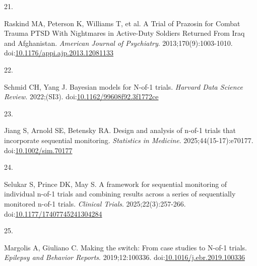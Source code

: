 \documentclass[
  11pt,
]{article}
\newlength{\cslhangindent}
\newlength{\csllabelwidth}
\newenvironment{CSLReferences}[2] %
 {\begin{list}{}{%
  \setlength{\itemindent}{0pt}
  \setlength{\leftmargin}{0pt}
  \setlength{\parsep}{0pt}
  \ifodd #1
   \setlength{\leftmargin}{\cslhangindent}
   \setlength{\itemindent}{-1\cslhangindent}
  \fi
  \setlength{\itemsep}{#2\baselineskip}}}
 {\end{list}}
\newcommand{\CSLLeftMargin}[1]{\parbox[t]{\csllabelwidth}{\strut#1\strut}}
\newcommand{\CSLRightInline}[1]{\parbox[t]{\linewidth - \csllabelwidth}{\strut#1\strut}}
\begin{document}
\begin{CSLReferences}{0}{1}
\CSLLeftMargin{21. }%
\CSLRightInline{Raskind MA, Peterson K, Williams T, et al. A {Trial} of {Prazosin} for {Combat Trauma PTSD With Nightmares} in {Active-Duty Soldiers Returned From Iraq} and {Afghanistan}. \emph{American Journal of Psychiatry}. 2013;170(9):1003-1010. doi:\href{https://doi.org/10.1176/appi.ajp.2013.12081133}{10.1176/appi.ajp.2013.12081133}}

\CSLLeftMargin{22. }%
\CSLRightInline{Schmid CH, Yang J. Bayesian models for {N}-of-1 trials. \emph{Harvard Data Science Review}. 2022;(SI3). doi:\href{https://doi.org/10.1162/99608f92.3f1772ce}{10.1162/99608f92.3f1772ce}}

\CSLLeftMargin{23. }%
\CSLRightInline{Jiang S, Arnold SE, Betensky RA. Design and analysis of n-of-1 trials that incorporate sequential monitoring. \emph{Statistics in Medicine}. 2025;44(15-17):e70177. doi:\href{https://doi.org/10.1002/sim.70177}{10.1002/sim.70177}}

\CSLLeftMargin{24. }%
\CSLRightInline{Selukar S, Prince DK, May S. A framework for sequential monitoring of individual n-of-1 trials and combining results across a series of sequentially monitored n-of-1 trials. \emph{Clinical Trials}. 2025;22(3):257-266. doi:\href{https://doi.org/10.1177/17407745241304284}{10.1177/17407745241304284}}

\CSLLeftMargin{25. }%
\CSLRightInline{Margolis A, Giuliano C. Making the switch: From case studies to {N}-of-1 trials. \emph{Epilepsy and Behavior Reports}. 2019;12:100336. doi:\href{https://doi.org/10.1016/j.ebr.2019.100336}{10.1016/j.ebr.2019.100336}}

\end{CSLReferences}
\end{document}
